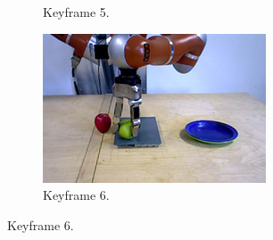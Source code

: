 \begin{figure}
\begin{subfigure}[t]{0.475\textwidth}
    \caption{Keyframe 5.}
    \label{fig:sec_usingaffordanceforplanning_results_scenario2_5}
  \end{subfigure}
  \hfill
  \begin{subfigure}[t]{0.475\textwidth}
    \includegraphics[width=\textwidth]{./figures/sec/planning/exec2/frame2164.jpg}
    \caption{Keyframe 6.}
    \label{fig:sec_usingaffordanceforplanning_results_scenario2_6}
  \end{subfigure}
\end{figure}
